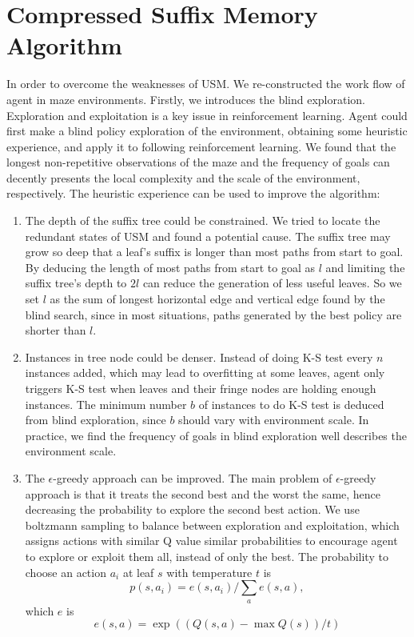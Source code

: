 \documentclass{article}
\begin{document}
\section{Compressed Suffix Memory Algorithm}

In order to overcome the weaknesses of USM. We re-constructed the work flow of agent in maze
environments. Firstly, we introduces the blind exploration. Exploration and exploitation
is a key issue in reinforcement learning. Agent could first make a blind policy exploration
of the environment, obtaining some heuristic experience, and apply it to following reinforcement
learning. We found that the longest non-repetitive observations of the maze and the frequency
of goals can decently presents the local complexity and the scale of the environment, respectively.
The heuristic experience can be used to improve the algorithm:

\begin{enumerate}
  \item The depth of the suffix tree could be constrained. We tried to locate the redundant
  states of USM and found a potential cause. The suffix tree may grow so deep that a leaf's
  suffix is longer than most paths from start to goal. By deducing the length of most paths
  from start to goal as $l$ and limiting the suffix tree's depth to $2l$ can reduce the
  generation of less useful leaves. So we set $l$ as the sum of longest horizontal edge and
  vertical edge found by the blind search, since in most situations, paths generated by
  the best policy are shorter than $l$.

  \item Instances in tree node could be denser. Instead of doing K-S test every $n$ instances
  added, which may lead to overfitting at some leaves, agent only triggers K-S test when leaves
  and their fringe nodes are holding enough instances. The minimum number $b$ of instances to do K-S
  test is deduced from blind exploration, since $b$ should vary with environment scale. In practice,
  we find the frequency of goals in blind exploration well describes the environment scale.

  \item The $\epsilon$-greedy approach can be improved. The main problem of
  $\epsilon$-greedy approach is that it treats the second best and the worst the same, hence
  decreasing the probability to explore the second best action. We use boltzmann
  sampling to balance between exploration and exploitation, which assigns actions with similar
  Q value similar probabilities to encourage agent to explore or exploit them all, instead of
  only the best. The probability to choose an action $a_i$ at leaf $s$ with temperature $t$ is
    \begin{equation}
      p(s, a_i) = e(s, a_i)/ \sum_a{e(s, a)} \label{equ:boltzmann},
    \end{equation}  
  which $e$ is
    \begin{equation}
      e(s, a) = \exp( (Q(s, a) - \max Q(s))/t )
    \end{equation}

\end{enumerate}
\end{document}
